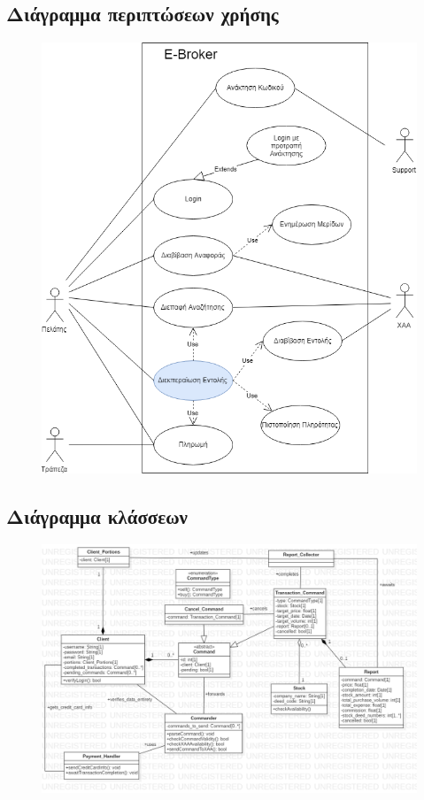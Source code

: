 \documentclass{article}
\begin{document}
\subsection{Διάγραμμα περιπτώσεων χρήσης}
\begin{figure}[!h]
	\includegraphics[width=\linewidth]{../UML/Use_Case_Diagram.png}
\end{figure}

\newpage
\subsection{Διάγραμμα κλάσσεων}
\begin{figure}[!h]
	\includegraphics[width=\linewidth]{../UML/class_diagram.png}
\end{figure}
\end{document}

